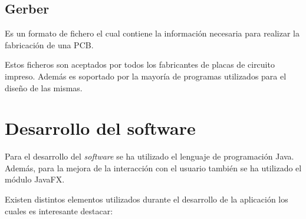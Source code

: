 \subsection{Gerber}\label{gerber}
Es un formato de fichero el cual contiene la información necesaria para realizar la fabricación de una PCB.

Estos ficheros son aceptados por todos los fabricantes de placas de circuito impreso. Además es soportado por la mayoría de programas utilizados para el diseño de las mismas.

\section{Desarrollo del software}\label{desarrollo_del_software}


Para el desarrollo del \emph{software} se ha utilizado el lenguaje de programación Java. Además, para la mejora de la interacción con el usuario también se ha utilizado el módulo JavaFX.

Existen distintos elementos utilizados durante el desarrollo de la aplicación los cuales es interesante destacar:

